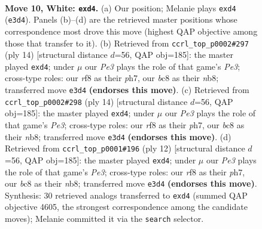 \documentclass[11pt]{article}
\begin{document}
\clearpage

\begin{figure}[p]\centering
\begin{subfigure}{0.46\textwidth}\centering
\resizebox{\linewidth}{!}{%
\newchessgame
\chessboard[
  setfen={rnbq1rk1/pp3ppp/4pn2/8/2Bp4/2P1PN2/P4PPP/R1BQ1RK1 w - - 0 10},
  showmover=false,
  pgfstyle=straightmove, color=movearrow, markmove={e3-d4}
]}
\caption{}
\end{subfigure}\hfill
\begin{subfigure}{0.46\textwidth}\centering
\resizebox{\linewidth}{!}{%
\newchessgame
\chessboard[
  setfen={rnbqkb1r/pp3ppp/4pn2/8/2Bp4/4PN2/PP3PPP/RNBQ1RK1 w kq - 0 8},
  showmover=false,
  pgfstyle=straightmove, color=movearrow, markmove={e3-d4}
]}
\caption{}
\end{subfigure}
\\[4pt]
\begin{subfigure}{0.46\textwidth}\centering
\resizebox{\linewidth}{!}{%
\newchessgame
\chessboard[
  setfen={rnbqkb1r/pp3ppp/4pn2/8/2Bp4/4PN2/PP3PPP/RNBQ1RK1 w kq - 0 8},
  showmover=false,
  pgfstyle=straightmove, color=movearrow, markmove={e3-d4}
]}
\caption{}
\end{subfigure}\hfill
\begin{subfigure}{0.46\textwidth}\centering
\resizebox{\linewidth}{!}{%
\newchessgame
\chessboard[
  setfen={rnbqkb1r/pp3ppp/4pn2/8/2Bp4/4PN2/PP3PPP/RNBQ1RK1 w kq - 0 7},
  showmover=false,
  pgfstyle=straightmove, color=movearrow, markmove={e3-d4}
]}
\caption{}
\end{subfigure}
\caption{\textbf{Move 10, White: \texttt{exd4}.} (a) Our position; Melanie plays \texttt{exd4} (\texttt{e3d4}). Panels (b)--(d) are the retrieved master positions whose correspondence most drove this move (highest QAP objective among those that transfer to it). (b) Retrieved from \texttt{ccrl\_top\_p0002\#297} (ply 14) [structural distance $d$=56, QAP obj=185]: the master played \texttt{exd4}; under $\mu$ our \emph{Pe3} plays the role of that game's \emph{Pe3}; cross-type roles: our \emph{r}f8 as their \emph{p}h7, our \emph{b}c8 as their \emph{n}b8; transferred move \texttt{e3d4} \textbf{(endorses this move)}. (c) Retrieved from \texttt{ccrl\_top\_p0002\#298} (ply 14) [structural distance $d$=56, QAP obj=185]: the master played \texttt{exd4}; under $\mu$ our \emph{Pe3} plays the role of that game's \emph{Pe3}; cross-type roles: our \emph{r}f8 as their \emph{p}h7, our \emph{b}c8 as their \emph{n}b8; transferred move \texttt{e3d4} \textbf{(endorses this move)}. (d) Retrieved from \texttt{ccrl\_top\_p0001\#196} (ply 12) [structural distance $d$=56, QAP obj=185]: the master played \texttt{exd4}; under $\mu$ our \emph{Pe3} plays the role of that game's \emph{Pe3}; cross-type roles: our \emph{r}f8 as their \emph{p}h7, our \emph{b}c8 as their \emph{n}b8; transferred move \texttt{e3d4} \textbf{(endorses this move)}. Synthesis: 30 retrieved analogs transferred to \texttt{exd4} (summed QAP objective 4605, the strongest correspondence among the candidate moves); Melanie committed it via the \texttt{search} selector.}
\label{fig:thought-m18}
\end{figure}
\end{document}

